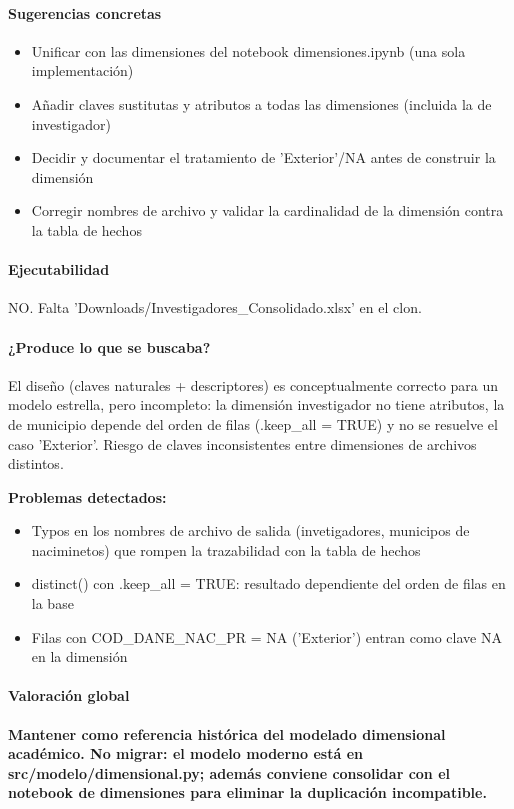 \paragraph{Sugerencias concretas}
\begin{itemize}
  \item Unificar con las dimensiones del notebook dimensiones.ipynb (una sola implementación)
  \item Añadir claves sustitutas y atributos a todas las dimensiones (incluida la de investigador)
  \item Decidir y documentar el tratamiento de 'Exterior'/NA antes de construir la dimensión
  \item Corregir nombres de archivo y validar la cardinalidad de la dimensión contra la tabla de hechos
\end{itemize}

\paragraph{Ejecutabilidad}
NO. Falta 'Downloads/Investigadores\_Consolidado.xlsx' en el clon.

\paragraph{¿Produce lo que se buscaba?}
El diseño (claves naturales + descriptores) es conceptualmente correcto para un modelo estrella, pero incompleto: la dimensión investigador no tiene atributos, la de municipio depende del orden de filas (.keep\_all = TRUE) y no se resuelve el caso 'Exterior'. Riesgo de claves inconsistentes entre dimensiones de archivos distintos.

\begin{tcolorbox}[riesgo]
\textbf{Problemas detectados:}
\begin{itemize}
  \item Typos en los nombres de archivo de salida (invetigadores, municipos de naciminetos) que rompen la trazabilidad con la tabla de hechos
  \item distinct() con .keep\_all = TRUE: resultado dependiente del orden de filas en la base
  \item Filas con COD\_DANE\_NAC\_PR = NA ('Exterior') entran como clave NA en la dimensión
\end{itemize}
\end{tcolorbox}

\paragraph{Valoración global}
\textbf{Mantener como referencia histórica del modelado dimensional académico. No migrar: el modelo moderno está en src/modelo/dimensional.py; además conviene consolidar con el notebook de dimensiones para eliminar la duplicación incompatible.}

